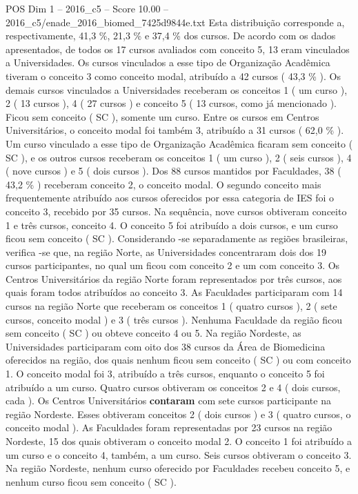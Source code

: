 \begin{textsample}{POS Dim 1 – 2016\_c5 – Score 10.00 – 2016\_c5/enade\_2016\_biomed\_7425d9844e.txt}
Esta distribuição corresponde a, respectivamente, 41,3 \%, 21,3 \% e 37,4 \% dos cursos.
De acordo com os dados apresentados, de todos os 17 cursos avaliados com conceito 5, 13 eram vinculados a Universidades.
Os cursos vinculados a esse tipo de Organização Acadêmica tiveram o conceito 3 como conceito modal, atribuído a 42 cursos ( 43,3 \% ).
Os demais cursos vinculados a Universidades receberam os conceitos 1 ( um curso ), 2 ( 13 cursos ), 4 ( 27 cursos ) e conceito 5 ( 13 cursos, como já mencionado ).
Ficou sem conceito ( SC ), somente um curso.
Entre os cursos em Centros Universitários, o conceito modal foi também 3, atribuído a 31 cursos ( 62,0 \% ).
Um curso vinculado a esse tipo de Organização Acadêmica ficaram sem conceito ( SC ), e os outros cursos receberam os conceitos 1 ( um curso ), 2 ( seis cursos ), 4 ( nove cursos ) e 5 ( dois cursos ).
Dos 88 cursos mantidos por Faculdades, 38 ( 43,2 \% ) receberam conceito 2, o conceito modal.
O segundo conceito mais frequentemente atribuído aos cursos oferecidos por essa categoria de IES foi o conceito 3, recebido por 35 cursos.
Na sequência, nove cursos obtiveram conceito 1 e três cursos, conceito 4.
O conceito 5 foi atribuído a dois cursos, e um curso ficou sem conceito ( SC ).
Considerando -se separadamente as regiões brasileiras, verifica -se que, na região Norte, as Universidades concentraram dois dos 19 cursos participantes, no qual um ficou com conceito 2 e um com conceito 3.
Os Centros Universitários da região Norte foram representados por três cursos, aos quais foram todos atribuídos ao conceito 3.
As Faculdades participaram com 14 cursos na região Norte que receberam os conceitos 1 ( quatro cursos ), 2 ( sete cursos, conceito modal ) e 3 ( três cursos ).
Nenhuma Faculdade da região ficou sem conceito ( SC ) ou obteve conceito 4 ou 5.
Na região Nordeste, as Universidades participaram com oito dos 38 cursos da Área de Biomedicina oferecidos na região, dos quais nenhum ficou sem conceito ( SC ) ou com conceito 1.
O conceito modal foi 3, atribuído a três cursos, enquanto o conceito 5 foi atribuído a um curso.
Quatro cursos obtiveram os conceitos 2 e 4 ( dois cursos, cada ).
Os Centros Universitários \textbf{contaram} com sete cursos participante na região Nordeste.
Esses obtiveram conceitos 2 ( dois cursos ) e 3 ( quatro cursos, o conceito modal ).
As Faculdades foram representadas por 23 cursos na região Nordeste, 15 dos quais obtiveram o conceito modal 2.
O conceito 1 foi atribuído a um curso e o conceito 4, também, a um curso.
Seis cursos obtiveram o conceito 3.
Na região Nordeste, nenhum curso oferecido por Faculdades recebeu conceito 5, e nenhum curso ficou sem conceito ( SC ).

\end{textsample}
